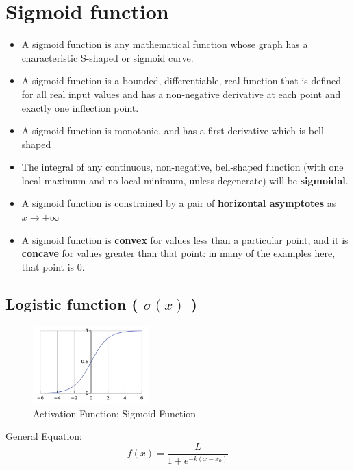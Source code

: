 \section{Sigmoid function \cite{wiki-activation-fn,wiki-Sigmoid_function}}

\begin{itemize}
    \item A sigmoid function is any mathematical function whose graph has a characteristic S-shaped or sigmoid curve.
    \item A sigmoid function is a bounded, differentiable, real function that is defined for all real input values and has a non-negative derivative at each point and exactly one inflection point.
    \item A sigmoid function is monotonic, and has a first derivative which is bell shaped
    \item The integral of any continuous, non-negative, bell-shaped function (with one local maximum and no local minimum, unless degenerate) will be \textbf{sigmoidal}.
    \item A sigmoid function is constrained by a pair of \textbf{horizontal asymptotes} as $x\rightarrow \pm \infty$
    \item A sigmoid function is \textbf{convex} for values less than a particular point, and it is \textbf{concave} for values greater than that point: in many of the examples here, that point is 0.
\end{itemize}

\subsection{Logistic function ( $\sigma(x)$ ) \cite{wiki-Logistic_function,wiki-Sigmoid_function}}\label{Logistic function}

\begin{figure}[H]
    \centering
    \includegraphics[height=3cm]{Pictures/activation-fns/sigmoid-fn.jpg}
    \caption{Activation Function: Sigmoid Function}
\end{figure}

General Equation:
\[
    f(x) = {\displaystyle\frac{L}{1 + e^{-k(x - x_{0})}}}
\]


